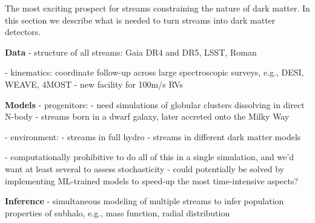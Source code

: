 \documentclass[final,5p,times,twocolumn,authoryear]{elsarticle}
\begin{document}
The most exciting prospect for streams constraining the nature of dark matter.
In this section we describe what is needed to turn streams into dark matter detectors.


\textbf{Data}
- structure of all streams: Gaia DR4 and DR5, LSST, Roman

- kinematics: coordinate follow-up across large spectroscopic surveys, e.g., DESI, WEAVE, 4MOST
- new facility for 100m/s RVs


\textbf{Models}
- progenitors:
- need simulations of globular clusters dissolving in direct N-body
- streams born in a dwarf galaxy, later accreted onto the Milky Way

- environment:
- streams in full hydro
- streams in different dark matter models

- computationally prohibitive to do all of this in a single simulation, and we'd want at least several to assess stochasticity
- could potentially be solved by implementing ML-trained models to speed-up the most time-intensive aspects?


\textbf{Inference}
- simultaneous modeling of multiple streams to infer population properties of subhalo, e.g., mass function, radial distribution
\end{document}
